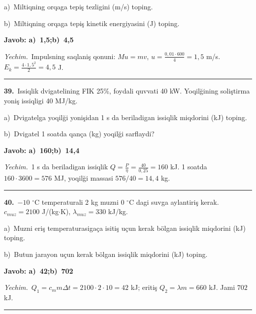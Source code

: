 \documentclass[11pt,a4paper]{article}
\begin{document}
\noindent\hspace*{4mm}a)\ Miltiqning orqaga tepiş tezligini (m/s) toping.\par
\noindent\hspace*{4mm}b)\ Miltiqning orqaga tepiş kinetik energiyasini (J) toping.\par
\noindent\colorbox{gray!12}{\parbox{\dimexpr\linewidth-2\fboxsep}{\textbf{Javob: a)\ 1,5;\quad b)\ 4,5}}}\par\smallskip
\noindent\textit{Yechim.}\ Impulsning saqlaniş qonuni: $Mu=mv$, $u=\frac{0{,}01\cdot600}{4}=1{,}5$ m/s. $E_k=\frac{4\cdot1{,}5^2}{2}=4{,}5$ J.\par\par\medskip\hrule\medskip
{}\noindent\textbf{39.}\ Issiqlik dvigatelining FIK 25\%, foydali quvvati 40 kW. Yoqilğining soliştirma yoniş issiqligi 40 MJ/kg.\par
\noindent\hspace*{4mm}a)\ Dvigatelga yoqilği yonişidan 1 s da beriladigan issiqlik miqdorini (kJ) toping.\par
\noindent\hspace*{4mm}b)\ Dvigatel 1 soatda qança (kg) yoqilği sarflaydi?\par
\noindent\colorbox{gray!12}{\parbox{\dimexpr\linewidth-2\fboxsep}{\textbf{Javob: a)\ 160;\quad b)\ 14,4}}}\par\smallskip
\noindent\textit{Yechim.}\ 1 s da beriladigan issiqlik $Q=\frac{P}{\eta}=\frac{40}{0{,}25}=160$ kJ. 1 soatda $160\cdot3600=576$ MJ, yoqilği massasi $576/40=14{,}4$ kg.\par\par\medskip\hrule\medskip
{}\noindent\textbf{40.}\ $-10$ $^\circ$C temperaturali 2 kg muzni 0 $^\circ$C dagi suvga aylantiriş kerak. $c_{muz}=2100$ J/(kg$\cdot$K), $\lambda_{muz}=330$ kJ/kg.\par
\noindent\hspace*{4mm}a)\ Muzni eriş temperaturasigaça isitiş uçun kerak bölgan issiqlik miqdorini (kJ) toping.\par
\noindent\hspace*{4mm}b)\ Butun jarayon uçun kerak bölgan issiqlik miqdorini (kJ) toping.\par
\noindent\colorbox{gray!12}{\parbox{\dimexpr\linewidth-2\fboxsep}{\textbf{Javob: a)\ 42;\quad b)\ 702}}}\par\smallskip
\noindent\textit{Yechim.}\ $Q_1=c_mm\Delta t=2100\cdot2\cdot10=42$ kJ; eritiş $Q_2=\lambda m=660$ kJ. Jami $702$ kJ.\par\par\medskip\hrule\medskip
\end{document}
